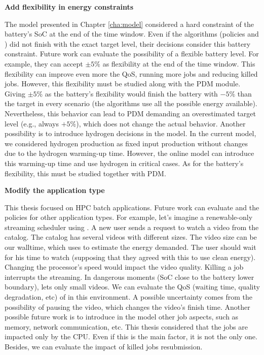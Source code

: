 \textbf{Add flexibility in energy constraints}

The model presented in Chapter \ref{cha:model} considered a hard constraint of the battery's SoC at the end of the time window. Even if the algorithms (policies and \emph{\systemName}) did not finish with the exact target level, their decisions consider this battery constraint. Future work can evaluate the possibility of a flexible battery level. For example, they can accept $\pm 5\%$ as flexibility at the end of the time window. This flexibility can improve even more the QoS, running more jobs and reducing killed jobs. However, this flexibility must be studied along with the PDM module. Giving $\pm 5\%$ as the battery's flexibility would finish the battery with $-5\%$ than the target in every scenario (the algorithms use all the possible energy available). Nevertheless, this behavior can lead to PDM demanding an overestimated target level (e.g., always $+5\%$), which does not change the actual behavior. Another possibility is to introduce hydrogen decisions in the model. In the current model, we considered hydrogen production as fixed input production without changes due to the hydrogen warming-up time. However, the online model can introduce this warming-up time and use hydrogen in critical cases. As for the battery's flexibility, this must be studied together with PDM.

\textbf{Modify the application type}

This thesis focused on HPC batch applications. Future work can evaluate \emph{\systemName} and the policies for other application types. For example, let's imagine a renewable-only streaming scheduler using \emph{\systemName}. A new user sends a request to watch a video from the catalog. The catalog has several videos with different sizes. The video size can be our walltime, which \emph{\systemName} uses to estimate the energy demanded. The user should wait for his time to watch (supposing that they agreed with this to use clean energy). Changing the processor's speed would impact the video quality. Killing a job interrupts the streaming. In dangerous moments (SoC close to the battery lower boundary), \emph{\systemName} lets only small videos. We can evaluate the QoS (waiting time, quality degradation, etc) of \emph{\systemName} in this environment. A possible uncertainty comes from the possibility of pausing the video, which changes the video's finish time. Another possible future work is to introduce in the model other job aspects, such as memory, network communication, etc. This thesis considered that the jobs are impacted only by the CPU. Even if this is the main factor, it is not the only one. Besides, we can evaluate the impact of killed jobs resubmission.

